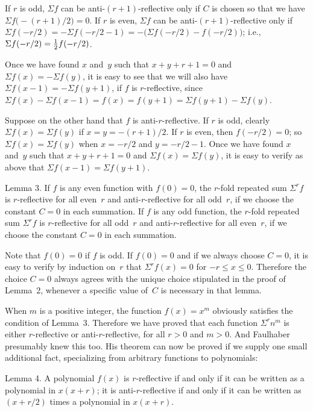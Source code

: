 \proof
If $r$ is odd, $\Sigma f$ can be anti-$(r+1)$-reflective only if $C$
is chosen so that we have  $\Sigma f\bigl(-(r+1)/2\bigr)=0$. If $r$ is even,
$\Sigma f$ can be anti-$(r+1)$-reflective only if $\Sigma
f(-r/2)=-\Sigma f(-r/2-1)=-\bigl(\Sigma f(-r/2)-f(-r/2)\bigr)$; 
i.e., $\Sigma f(-r/2)={1\over 2}f(-r/2)$.

Once we have found $x$ and~$y$ such that $x+y+r+1=0$ and $\Sigma
f(x)=-\Sigma f(y)$, it is easy to see that we will also have $\Sigma
f(x-1)=-\Sigma f(y+1)$, if $f$ is $r$-reflective, since $\Sigma
f(x)-\Sigma f(x-1)=f(x)=f(y+1)=\Sigma f(y+1)-\Sigma f(y)$.

Suppose on the other hand that $f$ is anti-$r$-reflective. If $r$ is
odd, clearly $\Sigma f(x)=\Sigma f(y)$ if $x=y=-(r+1)/2$. If $r$ is
even, then $f(-r/2)=0$; so $\Sigma f(x)=\Sigma f(y)$ when
$x=-r/2$ and $y=-r/2-1$. Once we have found $x$ and~$y$ such that
$x+y+r+1=0$ and $\Sigma f(x)=\Sigma f(y)$, it is easy to verify as
above that $\Sigma f(x-1)=\Sigma f(y+1)$.\quad\pfbox

\proclaim
Lemma 3. If $f$ is any even function with $f(0)=0$, the $r$-fold
repeated sum $\Sigma^rf$ is $r$-reflective for all even~$r$ and
anti-$r$-reflective for all odd~$r$, if we choose the constant $C=0$
in each summation. If $f$ is any odd function, the $r$-fold repeated
sum $\Sigma^rf$ is $r$-reflective for all odd~$r$ and
anti-$r$-reflective for all even~$r$, if we choose the constant $C=0$
in each summation.

\proof
Note that $f(0)=0$ if $f$ is odd. If $f(0)=0$ and if we
always choose $C=0$, it is easy to verify by induction on~$r$ that
$\Sigma^rf(x)=0$ for $-r\leq x\leq 0$. Therefore the choice $C=0$
always agrees with the unique choice stipulated in the proof of
Lemma~2, whenever a specific value of~$C$ is necessary in that
lemma.\quad\pfbox

\bigskip
When $m$ is a positive integer, the function $f(x)=x^m$ obviously
satisfies the condition of Lemma~3. Therefore we have proved that each
function $\Sigma^rn^m$ is either $r$-reflective or
anti-$r$-reflective, for all $r>0$ and $m>0$. And Faulhaber presumably
knew this too. His theorem can now be proved if we supply one small
additional fact, specializing from arbitrary functions to polynomials:

\proclaim
Lemma 4. A polynomial $f(x)$ is $r$-reflective if and only if it can
be written as a polynomial in $x(x+r)$; it is anti-$r$-reflective if
and only if it can be written as $(x+r/2)$ times a polynomial in
$x(x+r)$.

